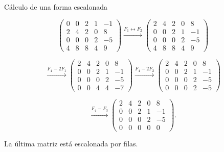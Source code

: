 \begin{frame}[allowframebreaks]{Cálculo de una forma escalonada}

\[
\begin{pmatrix}
0&0&2&1&-1\\
2&4&2&0&8\\
0&0&0&2&-5\\
4&8&8&4&9
\end{pmatrix}
\xrightarrow{F_1\leftrightarrow F_2}
\begin{pmatrix}
2&4&2&0&8\\
0&0&2&1&-1\\
0&0&0&2&-5\\
4&8&8&4&9
\end{pmatrix}
\]

\[
\xrightarrow{F_4-2F_1}
\begin{pmatrix}
2&4&2&0&8\\
0&0&2&1&-1\\
0&0&0&2&-5\\
0&0&4&4&-7
\end{pmatrix}
\xrightarrow{F_4-2F_2}
\begin{pmatrix}
2&4&2&0&8\\
0&0&2&1&-1\\
0&0&0&2&-5\\
0&0&0&2&-5
\end{pmatrix}
\]

\[
\xrightarrow{F_4-F_3}
\begin{pmatrix}
2&4&2&0&8\\
0&0&2&1&-1\\
0&0&0&2&-5\\
0&0&0&0&0
\end{pmatrix}.
\]

La última matriz está escalonada por filas.

\end{frame}


